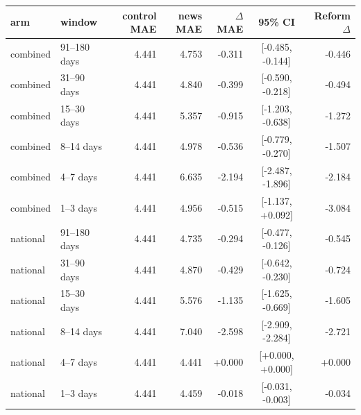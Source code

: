 \begin{tabular}{llrrrcr}
\toprule
arm & window & control MAE & news MAE & $\Delta$MAE & 95\% CI & Reform $\Delta$ \\
\midrule
combined & 91--180 days & 4.441 & 4.753 & -0.311 & [-0.485, -0.144] & -0.446 \\
combined & 31--90 days & 4.441 & 4.840 & -0.399 & [-0.590, -0.218] & -0.494 \\
combined & 15--30 days & 4.441 & 5.357 & -0.915 & [-1.203, -0.638] & -1.272 \\
combined & 8--14 days & 4.441 & 4.978 & -0.536 & [-0.779, -0.270] & -1.507 \\
combined & 4--7 days & 4.441 & 6.635 & -2.194 & [-2.487, -1.896] & -2.184 \\
combined & 1--3 days & 4.441 & 4.956 & -0.515 & [-1.137, +0.092] & -3.084 \\
national & 91--180 days & 4.441 & 4.735 & -0.294 & [-0.477, -0.126] & -0.545 \\
national & 31--90 days & 4.441 & 4.870 & -0.429 & [-0.642, -0.230] & -0.724 \\
national & 15--30 days & 4.441 & 5.576 & -1.135 & [-1.625, -0.669] & -1.605 \\
national & 8--14 days & 4.441 & 7.040 & -2.598 & [-2.909, -2.284] & -2.721 \\
national & 4--7 days & 4.441 & 4.441 & +0.000 & [+0.000, +0.000] & +0.000 \\
national & 1--3 days & 4.441 & 4.459 & -0.018 & [-0.031, -0.003] & -0.034 \\
\bottomrule
\end{tabular}
